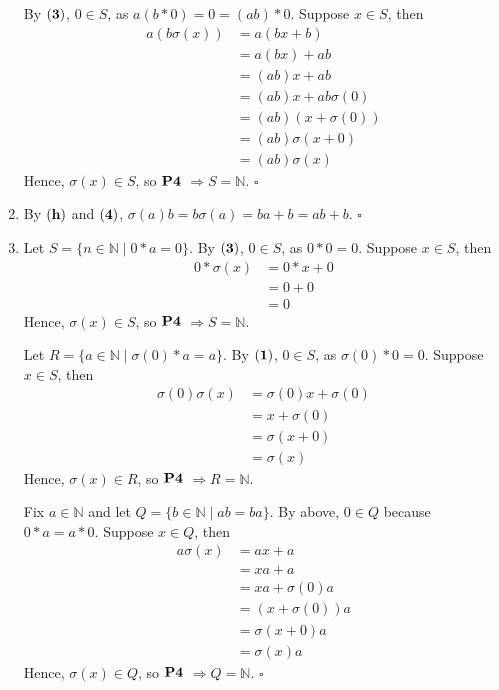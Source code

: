 \documentclass{article}
\begin{document}
\begin{enumerate}[label=\textbf{(\alph*)}]
{	By $\bf{(3)}$, $0 \in S$, as
	$a(b*0)=0=(ab)*0$.
	Suppose $x \in S$, then
	\begin{align*}
		a(b\sigma(x)) &= a(bx+b) 		\tag{4}\\
			&= a(bx) + ab				\tag{h,e}\\
			&= (ab)x + ab				\tag{IH}\\
			&= (ab)x + ab\sigma(0)		\tag{h}\\
			&= (ab)(x+\sigma(0))		\tag{e}\\
			&= (ab)\sigma(x+0)			\tag{2}\\
			&= (ab)\sigma(x)			\tag{1}
	\end{align*}
	Hence, $\sigma(x) \in S$, so $\bf{P4}$
	$\Rightarrow S = \mathbb{N}$.
	\hfill $\square$
}
\item{
	By $\bf{(h)}$ and $\bf{(4)}$,
	$\sigma(a)b=b\sigma(a)=ba+b=ab+b$.
	\hfill $\square$
}
\item{
	Let $S=\{n\in\mathbb{N}\mid0*a=0\}$.
	By $\bf{(3)}$, $0 \in S$, as
	$0*0=0$.
	Suppose $x\in S$, then
	\begin{align*}
		0*\sigma(x) &= 0*x + 0	\tag{4} \\
			&= 0 + 0			\tag{IH}\\
			&= 0				\tag{1}
	\end{align*}
	Hence, $\sigma(x) \in S$, so $\bf{P4}$
	$\Rightarrow S = \mathbb{N}$.

	Let $R=\{a\in\mathbb{N}\mid \sigma(0)*a=a\}$.
	By $\bf{(1)}$, $0 \in S$, as
	$\sigma(0)*0=0$.
	Suppose $x \in S$, then
	\begin{align*}
		\sigma(0)\sigma(x) &= \sigma(0)x+\sigma(0)	\tag{4}\\
			&= x + \sigma(0)		\tag{IH}\\
			&= \sigma(x+0)			\tag{2} \\
			&= \sigma(x)			\tag{1}
	\end{align*}
	Hence, $\sigma(x) \in R$, so $\bf{P4}$
	$\Rightarrow R = \mathbb{N}$.
	
	Fix $a\in\mathbb{N}$ and let
	$Q=\{b\in\mathbb{N}\mid ab=ba\}$.
	By above, $0 \in Q$ because $0*a=a*0$.
	Suppose $x\in Q$, then
	\begin{align*}
		a\sigma(x) &= ax+a		\tag{4} \\
			&= xa+a				\tag{IH}\\
			&= xa+\sigma(0)a	\tag{above}\\
			&= (x+\sigma(0))a	\tag{e}\\
			&= \sigma(x+0)a		\tag{2}\\
			&= \sigma(x)a		\tag{1}
	\end{align*}
	Hence, $\sigma(x) \in Q$, so $\bf{P4}$
	$\Rightarrow Q = \mathbb{N}$.
	\hfill $\square$
}
\end{enumerate} 
  
\end{document}
